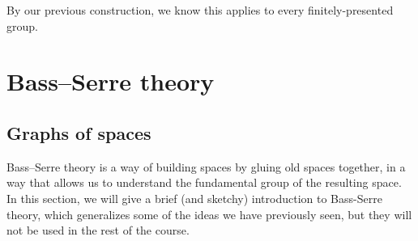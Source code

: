 \documentclass[a4paper]{article}
\begin{document}
By our previous construction, we know this applies to every finitely-presented group.
%
%
%
%

\section{Bass--Serre theory}
\subsection{Graphs of spaces}
Bass--Serre theory is a way of building spaces by gluing old spaces together, in a way that allows us to understand the fundamental group of the resulting space. In this section, we will give a brief (and sketchy) introduction to Bass-Serre theory, which generalizes some of the ideas we have previously seen, but they will not be used in the rest of the course.
\end{document}
